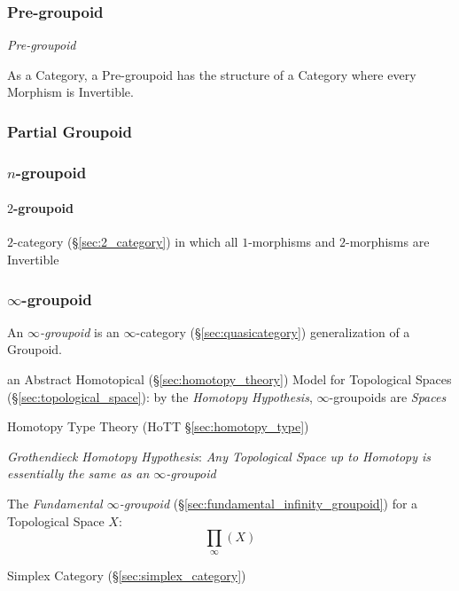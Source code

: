 \subsubsection{Pre-groupoid}\label{sec:pre_groupoid}

\emph{Pre-groupoid}

As a Category, a Pre-groupoid has the structure of a Category where
every Morphism is Invertible.



\subsubsection{Partial Groupoid}\label{sec:partial_groupoid}

\subsubsection{$n$-groupoid}\label{sec:n_groupoid}

\paragraph{$2$-groupoid}\label{sec:2_groupoid}\hfill

$2$-category (\S\ref{sec:2_category}) in which all $1$-morphisms and
$2$-morphisms are Invertible



\subsubsection{$\infty$-groupoid}\label{sec:infinity_groupoid}

An \emph{$\infty$-groupoid} is an $\infty$-category (\S\ref{sec:quasicategory})
generalization of a Groupoid.

an Abstract Homotopical (\S\ref{sec:homotopy_theory}) Model for Topological
Spaces (\S\ref{sec:topological_space}): by the \emph{Homotopy Hypothesis},
$\infty$-groupoids are \emph{Spaces}

\fist Homotopy Type Theory (HoTT \S\ref{sec:homotopy_type})

\emph{Grothendieck Homotopy Hypothesis}:
\emph{
  Any Topological Space up to Homotopy is essentially the same as an
  $\infty$-groupoid
}

The \emph{Fundamental $\infty$-groupoid}
(\S\ref{sec:fundamental_infinity_groupoid}) for a Topological Space $X$:
\[
  \prod_\infty(X)
\]

Simplex Category (\S\ref{sec:simplex_category})

